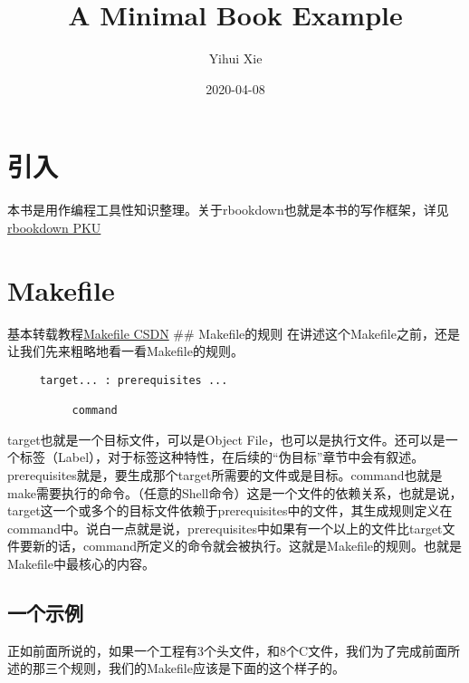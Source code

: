\documentclass[]{book}
\title{A Minimal Book Example}
\author{Yihui Xie}
\date{2020-04-08}
\begin{document}
\maketitle

{
\setcounter{tocdepth}{1}
\tableofcontents
}
\hypertarget{ux5f15ux5165}{%
\chapter{引入}\label{ux5f15ux5165}}

本书是用作编程工具性知识整理。关于rbookdown也就是本书的写作框架，详见\href{http://www.math.pku.edu.cn/teachers/lidf/docs/Rbook/html/_Rbook/bookdown.html}{rbookdown PKU}

\hypertarget{intro}{%
\chapter{Makefile}\label{intro}}

基本转载教程\href{https://blog.csdn.net/ruglcc/article/details/7814546}{Makefile CSDN}
\#\# Makefile的规则
在讲述这个Makefile之前，还是让我们先来粗略地看一看Makefile的规则。

\begin{verbatim}
     target... : prerequisites ...

          command
\end{verbatim}

target也就是一个目标文件，可以是Object File，也可以是执行文件。还可以是一个标签（Label），对于标签这种特性，在后续的``伪目标''章节中会有叙述。prerequisites就是，要生成那个target所需要的文件或是目标。command也就是make需要执行的命令。（任意的Shell命令）这是一个文件的依赖关系，也就是说，target这一个或多个的目标文件依赖于prerequisites中的文件，其生成规则定义在command中。说白一点就是说，prerequisites中如果有一个以上的文件比target文件要新的话，command所定义的命令就会被执行。这就是Makefile的规则。也就是Makefile中最核心的内容。

\hypertarget{ux4e00ux4e2aux793aux4f8b}{%
\section{一个示例}\label{ux4e00ux4e2aux793aux4f8b}}

正如前面所说的，如果一个工程有3个头文件，和8个C文件，我们为了完成前面所述的那三个规则，我们的Makefile应该是下面的这个样子的。
\end{document}
